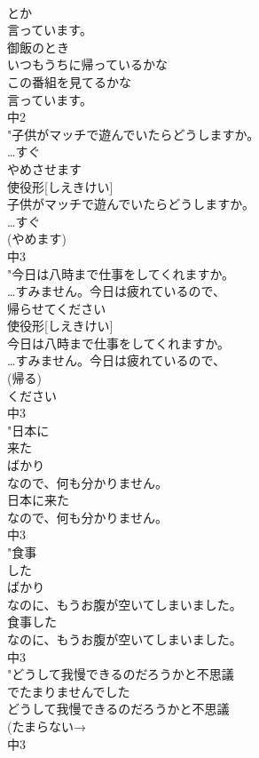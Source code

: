 \documentclass[8pt]{extreport}
\begin{document}
\begin{CJK}{UTF8}{min}
\\	とか
\\	言っています。
\\	御飯のとき
\\	いつもうちに帰っているかな
\\	この番組を見てるかな
\\	言っています。
\\	中2
\\	"子供がマッチで遊んでいたらどうしますか。
\\	…すぐ
\\	やめさせます
\\	使役形[しえきけい]	
\\	子供がマッチで遊んでいたらどうしますか。
\\	…すぐ
\\	(やめます)
\\	中3
\\	"今日は八時まで仕事をしてくれますか。
\\	…すみません。今日は疲れているので、
\\	帰らせてください
\\	使役形[しえきけい]	
\\	今日は八時まで仕事をしてくれますか。
\\	…すみません。今日は疲れているので、
\\	(帰る)
\\	ください
\\	中3
\\	"日本に
\\	来た
\\	ばかり
\\	なので、何も分かりません。
\\	日本に来た
\\	なので、何も分かりません。
\\	中3
\\	"食事
\\	した
\\	ばかり
\\	なのに、もうお腹が空いてしまいました。
\\	食事した
\\	なのに、もうお腹が空いてしまいました。
\\	中3
\\	"どうして我慢できるのだろうかと不思議
\\	でたまりませんでした
\\	どうして我慢できるのだろうかと不思議
\\	(たまらない→
\\	中3

\end{CJK}
\end{document}
